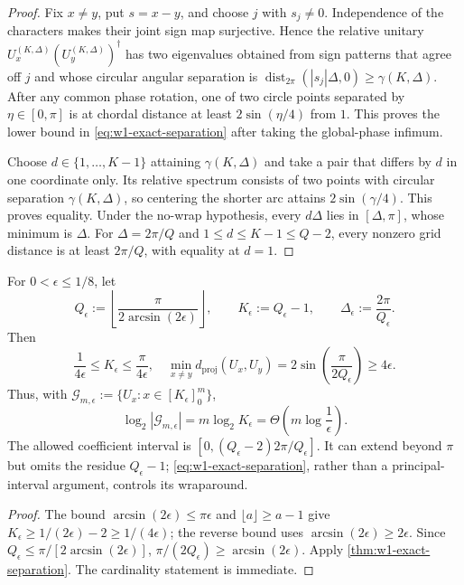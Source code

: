 \begin{proof}
Fix $x\neq y$, put $s=x-y$, and choose $j$ with $s_j\neq0$.
Independence of the characters makes their joint sign map surjective.
Hence the relative unitary $U_x^{(K,\Delta)}
(U_y^{(K,\Delta)})^\dagger$ has two eigenvalues obtained from sign patterns
that agree off $j$ and whose circular angular separation is
$\operatorname{dist}_{2\pi}(|s_j|\Delta,0)\geq\gamma(K,\Delta)$.
After any common phase rotation, one of two circle points separated by
$\eta\in[0,\pi]$ is at chordal distance at least
$2\sin(\eta/4)$ from $1$.  This proves the lower bound in
\eqref{eq:w1-exact-separation} after taking the global-phase infimum.

Choose $d\in\{1,\ldots,K-1\}$ attaining $\gamma(K,\Delta)$ and take a pair that
differs by $d$ in one coordinate only.  Its relative spectrum consists of
two points with circular separation $\gamma(K,\Delta)$, so centering the
shorter arc attains $2\sin(\gamma/4)$.  This proves equality.  Under the
no-wrap hypothesis, every $d\Delta$ lies in $[\Delta,\pi]$, whose minimum
is $\Delta$.  For $\Delta=2\pi/Q$ and
$1\leq d\leq K-1\leq Q-2$, every nonzero grid distance is at least
$2\pi/Q$, with equality at $d=1$.
\end{proof}

\begin{corollary}
\label{cor:w1-epsilon-cyclic}
For $0<\epsilon\leq1/8$, let
\begin{equation}
 Q_\epsilon:=\left\lfloor
 \frac{\pi}{2\arcsin(2\epsilon)}\right\rfloor,
 \qquad K_\epsilon:=Q_\epsilon-1,
 \qquad \Delta_\epsilon:=\frac{2\pi}{Q_\epsilon}.
 \label{eq:w1-epsilon-grid}
\end{equation}
Then
\begin{equation}
 \frac1{4\epsilon}\leq K_\epsilon\leq\frac{\pi}{4\epsilon},
 \quad
 \min_{x\neq y}d_{\mathrm{proj}}(U_x,U_y)
 =2\sin\!\left(\frac{\pi}{2Q_\epsilon}\right)
 \geq4\epsilon.
 \label{eq:w1-epsilon-pack}
\end{equation}
Thus, with $\mathcal G_{m,\epsilon}:=
\{U_x:x\in[K_\epsilon]_0^m\}$,
\begin{equation}
 \log_2|\mathcal G_{m,\epsilon}|
 =m\log_2K_\epsilon
 =\Theta\!\left(m\log\frac1\epsilon\right).
 \label{eq:w1-packing-entropy}
\end{equation}
The allowed coefficient interval is
$[0,(Q_\epsilon-2)2\pi/Q_\epsilon]$.  It can extend beyond $\pi$ but
omits the residue $Q_\epsilon-1$; \cref{eq:w1-exact-separation}, rather
than a principal-interval argument, controls its wraparound.
\end{corollary}

\begin{proof}
The bound $\arcsin(2\epsilon)\leq\pi\epsilon$ and
$\lfloor a\rfloor\geq a-1$ give
$K_\epsilon\geq1/(2\epsilon)-2\geq1/(4\epsilon)$; the reverse bound uses
$\arcsin(2\epsilon)\geq2\epsilon$.  Since
$Q_\epsilon\leq\pi/[2\arcsin(2\epsilon)]$,
$\pi/(2Q_\epsilon)\geq\arcsin(2\epsilon)$.  Apply
\cref{thm:w1-exact-separation}.  The cardinality statement is immediate.
\end{proof}
